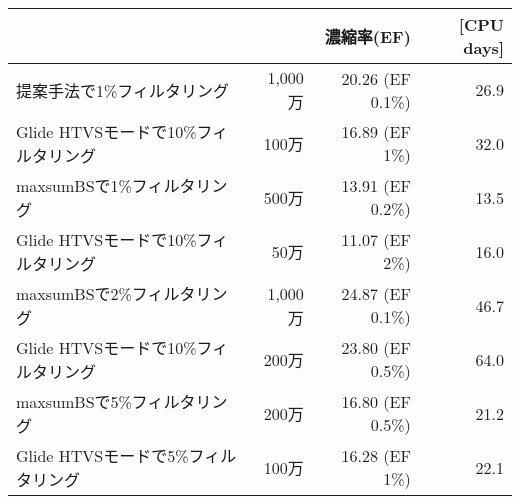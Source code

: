\begin{enumerate}
\begin{table}[htbp]
\begin{tabular}{l|rrr}
												&														&濃縮率(EF)				&[CPU days]		\\ \hline
	提案手法で1\%フィルタリング		&1,000万											&20.26 (EF 0.1\%)		&26.9				\\
	Glide HTVSモードで10\%フィルタリング	&100万												&16.89 (EF 1\%)			&32.0				\\ \hline
	maxsumBSで1\%フィルタリング		&500万												&13.91 (EF 0.2\%)		&13.5				\\
	Glide HTVSモードで10\%フィルタリング	&50万												&11.07 (EF 2\%)			&16.0				\\ \hline
	maxsumBSで2\%フィルタリング		&1,000万											&24.87 (EF 0.1\%)		&46.7				\\
	Glide HTVSモードで10\%フィルタリング	&200万												&23.80 (EF 0.5\%)		&64.0				\\ \hline
	maxsumBSで5\%フィルタリング		&200万												&16.80 (EF 0.5\%)		&21.2				\\
	Glide HTVSモードで5\%フィルタリング		&100万												&16.28 (EF 1\%)			&22.1				\\ \hline
	

	\end{tabular}
\end{table}
	
\end{enumerate}
